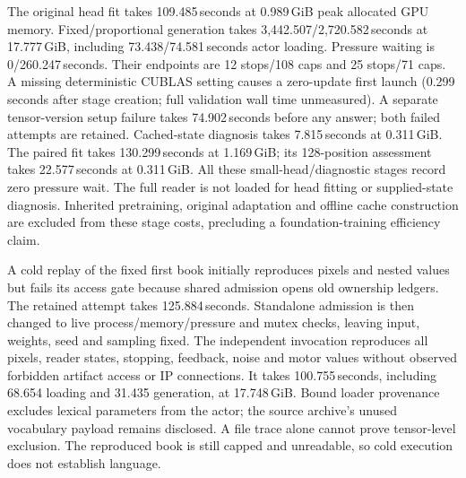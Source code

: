 \documentclass[12pt,a4paper]{article}
\providecommand{\DIFadd}[1]{{\protect\color{blue} \sf #1}} %
\begin{document}
\DIFadd{The original head fit takes 109.485\,seconds at 0.989\,GiB peak allocated GPU
memory. Fixed/proportional generation takes 3,442.507/2,720.582\,seconds at
17.777\,GiB, including 73.438/74.581\,seconds actor loading. Pressure waiting
is 0/260.247\,seconds. Their endpoints are 12 stops/108 caps and 25 stops/71
caps. A missing deterministic CUBLAS setting causes a zero-update first
launch (0.299\,seconds after stage creation; full validation wall time
unmeasured). A separate tensor-version setup failure takes 74.902\,seconds
before any answer; both failed attempts are retained. Cached-state diagnosis
takes 7.815\,seconds at 0.311\,GiB. The paired fit takes 130.299\,seconds at
1.169\,GiB; its 128-position assessment takes 22.577\,seconds at 0.311\,GiB.
All these small-head/diagnostic stages record zero pressure wait. The full
reader is not loaded for head fitting or supplied-state diagnosis. Inherited
pretraining, original adaptation and offline cache construction are excluded
from these stage costs, precluding a foundation-training efficiency claim.
}

\DIFadd{A cold replay of the fixed first book initially reproduces pixels and nested
values but fails its access gate because shared admission opens old ownership
ledgers. The retained attempt takes 125.884\,seconds. Standalone admission is
then changed to live process/memory/pressure and mutex checks, leaving input,
weights, seed and sampling fixed. The independent invocation reproduces all
pixels, reader states, stopping, feedback, noise and motor values without
observed forbidden artifact access or IP connections. It takes
100.755\,seconds, including 68.654 loading and 31.435 generation, at
17.748\,GiB. Bound loader provenance excludes lexical parameters from the
actor; the source archive's unused vocabulary payload remains disclosed.
A file trace alone cannot prove tensor-level exclusion. The reproduced book
is still capped and unreadable, so cold execution does not establish language.
}
\end{document}
